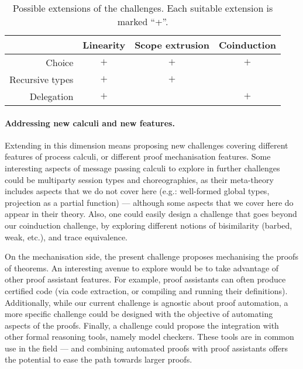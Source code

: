 \documentclass[runningheads]{llncs}
\begin{document}
\begin{table}[btp]
  \caption{Possible extensions of the challenges. Each suitable extension is marked ``+''. \label{tab:extensions}}
  \begin{center}\small
    \vspace{-4mm}%
    \begin{tabular}{|r|c|c|c|}
      \hline
      & Linearity & Scope extrusion & Coinduction \\
      \hline
      Choice & $+$ & $+$  & $+$ \\
      \hline
      Recursive types & $+$  & $+$ & \\
      \hline
      Delegation & $+$ & & $+$ \\
      \hline
    \end{tabular}
    \vspace{-3mm}%
  \end{center}
\end{table}

\vspace{-1mm}%
\paragraph{Addressing new calculi and new features.}
Extending in this dimension
means proposing new challenges covering different features of
process calculi, or different proof mechanisation features.
Some interesting aspects of message passing calculi to explore in
further challenges could be multiparty session types and
choreographies, as their meta-theory includes aspects
that we do not cover here (e.g.: well-formed global types,
projection as a partial function) --- although some aspects
that we cover here do appear in their theory. Also, one could easily
design a challenge that goes beyond our coinduction challenge, by
exploring different notions of bisimilarity (barbed, weak, etc.),
and trace equivalence.

On the mechanisation side, the present challenge proposes mechanising the
proofs of theorems. An interesting avenue to explore would be to take advantage
of other proof assistant features. For example, proof assistants can often
produce certified code (via code extraction, or compiling and running their
definitions). Additionally, while our current challenge is agnostic about proof
automation, a more specific challenge could be designed with the objective of
automating aspects of the proofs. Finally, a challenge could propose the
integration with other formal reasoning tools, namely model checkers. These
tools are in common use in the field --- and combining automated proofs with
proof assistants offers the potential to ease the path towards larger proofs.
\end{document}
